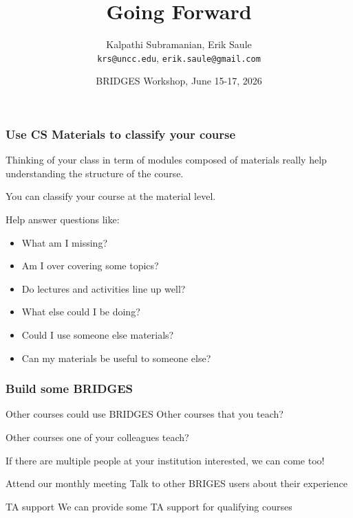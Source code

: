 \documentclass[aspectratio=169]{beamer}
\title{Going Forward}
\subtitle{}
\author{Kalpathi Subramanian, Erik Saule\\\texttt{krs@uncc.edu}, \texttt{erik.saule@gmail.com}}
\institute{The University of North Carolina at Charlotte}
\date{BRIDGES Workshop, June 15-17, 2026}
\begin{document}
\begin{frame}
\titlepage
\end{frame}



\begin{frame}
  \frametitle{Use CS Materials to classify your course}

  Thinking of your class in term of modules composed of materials really help understanding the structure of the course.

  You can classify your course at the material level.

  Help answer questions like:
  \begin{itemize}
  \item What am I missing?
  \item Am I over covering some topics?
  \item Do lectures and activities line up well?
  \item What else could I be doing?
  \item Could I use someone else materials?
  \item Can my materials be useful to someone else?
  \end{itemize}
\end{frame}

\begin{frame}
  \frametitle{Build some BRIDGES}
  \begin{block}{Other courses could use BRIDGES}
    Other courses that you teach?

    Other courses one of your colleagues teach?

    If there are multiple people at your institution interested, we can come too!
  \end{block}

  \begin{block}{Attend our monthly meeting}
    Talk to other BRIGES users about their experience
  \end{block}

  \begin{block}{TA support}
    We can provide some TA support for qualifying courses
  \end{block}
\end{frame}
\end{document}

